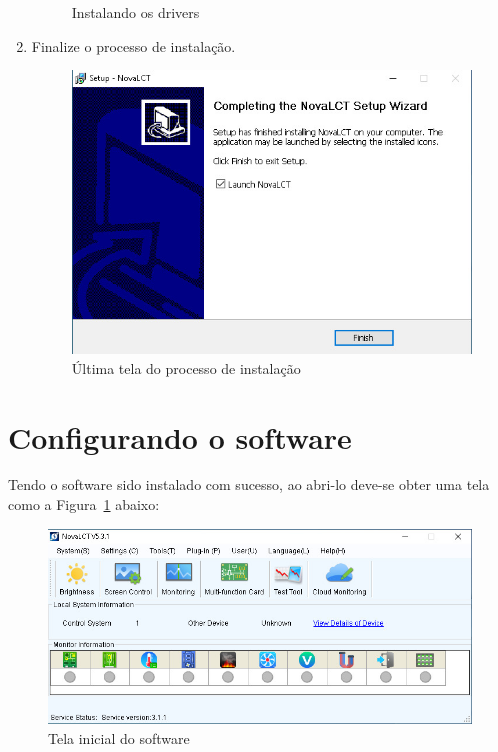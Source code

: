 \documentclass[12pt, a4paper]{article}
\begin{document}
\begin{enumerate}
\begin{figure}[!htb]
			\caption{Instalando os drivers}
		\end{figure}
		\newpage
	\item Finalize o processo de instalação.
		\begin{figure}[!htb]
			\centering
			\includegraphics[width=.8\textwidth]{DEnd.jpeg}
			\caption{Última tela do processo de instalação}
		\end{figure}
\end{enumerate}

\newpage
\section{Configurando o software}\label{Configurando o software}
Tendo o software sido instalado com sucesso, ao abri-lo deve-se obter uma tela como a Figura~\ref{fig:CS1.jpeg} abaixo:
\begin{figure}[!htb]
	\centering
	\includegraphics[width=\textwidth]{CS1.jpeg}
	\caption{\label{fig:CS1.jpeg}Tela inicial do software}
\end{figure}
\end{document}
